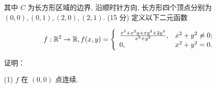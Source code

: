 \documentclass{examcollection}
\renewcommand{\displayformula}[1]{\[#1\]}
\begin{document}
{\begin{minipage}{\textwidth}
其中 $C$ 为长方形区域的边界, 沿顺时针方向, 长方形四个顶点分别为 $(0,0), (0,1), (2,0), (2,1)$.
(15 分) 定义以下二元函数\par
\displayformula{f: \mathbb {R} ^ {2} \to \mathbb {R}, f (x, y) = \left\{ \begin{array}{l l} \frac {x ^ {3} + x ^ {2} y + x y ^ {2} + 2 y ^ {4}}{x ^ {2} + y ^ {2}}, & x ^ {2} + y ^ {2} \neq 0; \\ 0, & x ^ {2} + y ^ {2} = 0. \end{array} \right.}\par
证明：\par
(1) $f$ 在 $(0,0)$ 点连续.\par
\end{minipage}}
\ifdim\dimexpr\ht\proofbox+\dp\proofbox\relax>\textheight
\noindent\resizebox{!}{\textheight}{\usebox{\proofbox}}\else\noindent\usebox{\proofbox}\fi\clearpage
\end{document}
